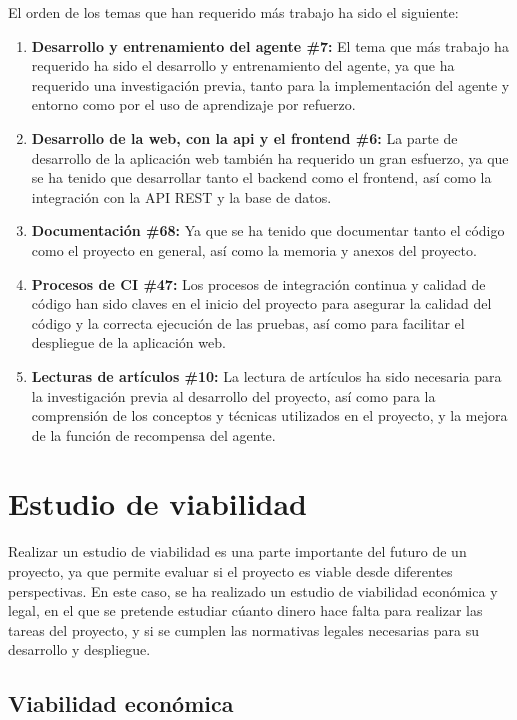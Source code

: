 
El orden de los temas que han requerido más trabajo ha sido el siguiente:
\begin{enumerate}
    \item \textbf{Desarrollo y entrenamiento del agente \#7:} El tema que más trabajo ha requerido ha sido el desarrollo y entrenamiento del agente, ya que ha requerido una investigación previa, tanto para la implementación del agente y entorno como por el uso de aprendizaje por refuerzo.
    \item \textbf{Desarrollo de la web, con la api y el frontend \#6:} La parte de desarrollo de la aplicación web también ha requerido un gran esfuerzo, ya que se ha tenido que desarrollar tanto el backend como el frontend, así como la integración con la API REST y la base de datos.
    \item \textbf{Documentación \#68:}  Ya que se ha tenido que documentar tanto el código como el proyecto en general, así como la memoria y anexos del proyecto.
    \item \textbf{Procesos de CI \#47:} Los procesos de integración continua y calidad de código han sido claves en el inicio del proyecto para asegurar la calidad del código y la correcta ejecución de las pruebas, así como para facilitar el despliegue de la aplicación web.
    \item \textbf{Lecturas de artículos \#10:} La lectura de artículos ha sido necesaria para la investigación previa al desarrollo del proyecto, así como para la comprensión de los conceptos y técnicas utilizados en el proyecto, y la mejora de la función de recompensa del agente.
\end{enumerate}

\section{Estudio de viabilidad}
Realizar un estudio de viabilidad es una parte importante del futuro de un proyecto, ya que permite evaluar si el proyecto es viable desde diferentes perspectivas. En este caso, se ha realizado un estudio de viabilidad económica y legal, en el que se pretende estudiar cúanto dinero hace falta para realizar las tareas del proyecto, y si se cumplen las normativas legales necesarias para su desarrollo y despliegue.

\subsection{Viabilidad económica}

